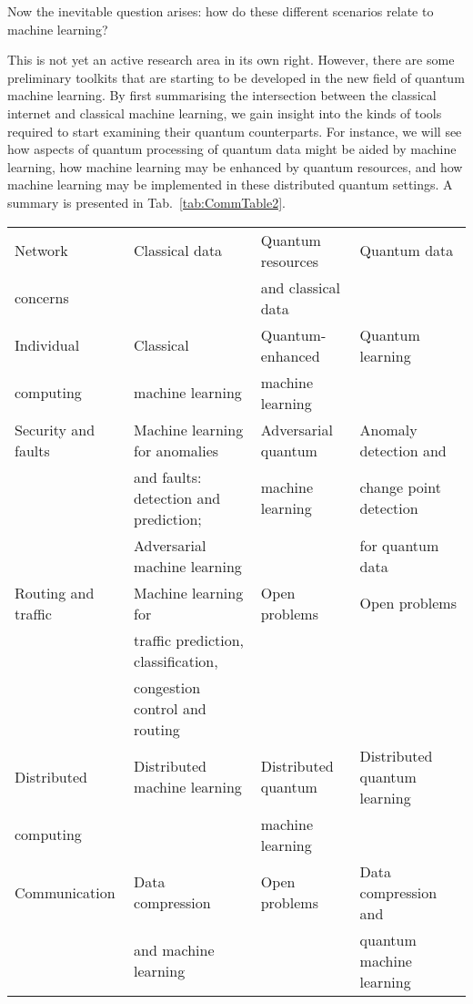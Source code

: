 \documentclass[twocolumn, aps, rmp, amsmath, amssymb, nofootinbib, superscriptaddress, longbibliography, floatfix, table-of-contents, eqsecnum]{revtex4}
\newcommand{\captionspacetab}[0]{\vspace{-0.6em}}
\begin{document}
Now the inevitable question arises: how do these different scenarios relate to machine learning?

This is not yet an active research area in its own right. However, there are some preliminary toolkits that are starting to be developed in the new field of quantum machine learning. By first summarising the intersection between the classical internet and classical machine learning, we gain insight into the kinds of tools required to start examining their quantum counterparts. For instance, we will see how aspects of quantum processing of quantum data might be aided by machine learning, how machine learning may be enhanced by quantum resources, and how machine learning may be implemented in these distributed quantum settings. A summary is presented in Tab.~\ref{tab:CommTable2}. 

\begin{table*}[htbp!]
\begin{tabular}{|l|l|l|l|}
\hline
Network  & Classical data & Quantum resources  & Quantum data \\
concerns & & and classical data & \\
\hline
\hline
Individual & Classical   & Quantum-enhanced  & Quantum learning  \\ 
computing & machine learning & machine learning & \\
\hline 
Security and faults & Machine learning for anomalies & Adversarial quantum & Anomaly detection and  \\
& and faults: detection and prediction; & machine learning  & change point detection \\
& Adversarial machine learning &  & for quantum data \\
\hline 
Routing and traffic & Machine learning for  & Open problems & Open problems \\
& traffic prediction, classification, &   &  \\
& congestion control and routing & & \\
\hline 
Distributed  & Distributed machine learning & Distributed quantum & Distributed quantum learning \\
computing & & machine learning & \\
\hline 
 Communication & Data compression & Open problems & Data compression and \\
 & and machine learning & & quantum machine learning \\
\hline 
\end{tabular}
\captionspacetab \caption{\label{tab:CommTable2} Classical and quantum machine learning applications in classical and quantum networks. Almost all of the categories here are very new and open to exploration in the quantum domain.}
\end{table*}
\end{document}
